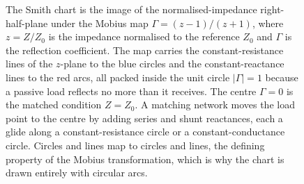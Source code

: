 \begin{figure}[htbp]
\centering
{}
\caption[The Smith chart as a Mobius image]{The Smith chart is the image
of the normalised-impedance right-half-plane under the Mobius map
$\Gamma = (z - 1)/(z + 1)$, where $z = Z/Z_0$ is the impedance
normalised to the reference $Z_0$ and $\Gamma$ is the reflection
coefficient. The map carries the constant-resistance lines of the
$z$-plane to the blue circles and the constant-reactance lines to the red
arcs, all packed inside the unit circle $|\Gamma| = 1$ because a passive
load reflects no more than it receives. The centre $\Gamma = 0$ is the
matched condition $Z = Z_0$. A matching network moves the load point to
the centre by adding series and shunt reactances, each a glide along a
constant-resistance circle or a constant-conductance circle. Circles and
lines map to circles and lines, the defining property of the Mobius
transformation, which is why the chart is drawn entirely with circular
arcs.}
\label{fig:vol02:ch03:smith-chart}
\end{figure}

